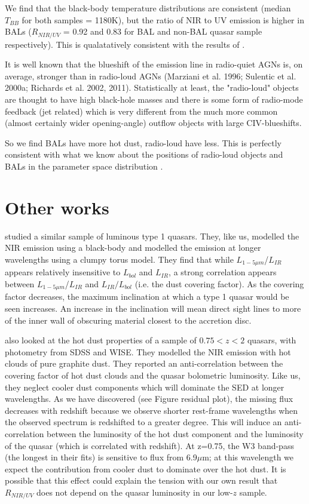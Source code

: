 We find that the black-body temperature distributions are consistent (median $T_{BB}$ for both samples = 1180K), but the ratio of NIR to UV emission is higher in BALs ($R_{NIR/UV}$ = 0.92 and 0.83 for BAL and non-BAL quasar sample respectively). 
This is qualatatively consistent with the results of \citet{zhang14}. 

It is well known that the blueshift of the  emission line in radio-quiet AGNs is, on average, stronger than in radio-loud AGNs (Marziani et al. 1996; Sulentic et al. 2000a; Richards et al. 2002, 2011). 
Statistically at least, the "radio-loud" objects are thought to have high black-hole masses and there is some form of radio-mode feedback (jet related) which is very different from the much more common (almost certainly wider opening-angle) outflow objects with large CIV-blueshifts.

So we find BALs have more hot dust, radio-loud have less. 
This is perfectly consistent with what we know about the positions of radio-loud objects and BALs in the  parameter space distribution \citep{richards11}. 

\section{Other works}

\citet{roseboom13} studied a similar sample of luminous type 1 quasars. 
They, like us, modelled the NIR emission using a black-body and modelled the emission at longer wavelengths using a clumpy torus model. 
They find that while $L_{1-5\mu m}$/$L_{IR}$ appears relatively insensitive to $L_{bol}$ and $L_{IR}$, a strong correlation appears between $L_{1-5\mu m}$/$L_{IR}$ and $L_{IR}/L_{bol}$ (i.e. the dust covering factor). 
As the covering factor decreases, the maximum inclination at which a type 1 quasar would be seen increases. 
An increase in the inclination will mean direct sight lines to more of the inner wall of obscuring material closest to the accretion disc.

\citet{mor11} also looked at the hot dust properties of a sample of $0.75 < z < 2$ quasars, with photometry from SDSS and WISE. 
They modelled the NIR emission with hot clouds of pure graphite dust. 
They reported an anti-correlation between the covering factor of hot dust clouds and the quasar bolometric luminosity. 
Like us, they neglect cooler dust components which will dominate the SED at longer wavelengths. 
As we have discovered (see Figure residual plot), the missing flux decreases with redshift because we observe shorter rest-frame wavelengths when the observed spectrum is redshifted to a greater degree. 
This will induce an anti-correlation between the luminosity of the hot dust component and the luminosity of the quasar (which is correlated with redshift). 
At z=0.75, the W3 band-pass (the longest in their fits) is sensitive to flux from 6.9$\mu$m; at this wavelength we expect the contribution from cooler dust to dominate over the hot dust. 
It is possible that this effect could explain the tension with our own result that $R_{NIR/UV}$ does not depend on the quasar luminosity in our low-$z$ sample. 

